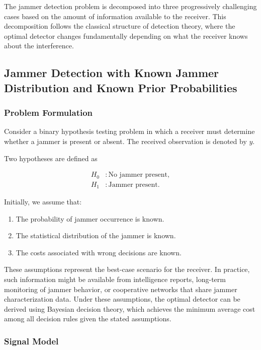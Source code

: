\documentclass{article}
\begin{document}
The jammer detection problem is decomposed into three progressively challenging cases based on the amount of information available to the receiver. This decomposition follows the classical structure of detection theory, where the optimal detector changes fundamentally depending on what the receiver knows about the interference.

\subsection{Jammer Detection with Known Jammer Distribution and Known Prior Probabilities}

\subsubsection{Problem Formulation}

Consider a binary hypothesis testing problem in which a receiver must determine whether a jammer is present or absent. The received observation is denoted by $y$.

Two hypotheses are defined as

\begin{align}
H_0 &: \text{No jammer present}, \\
H_1 &: \text{Jammer present}.
\end{align}

Initially, we assume that:

\begin{enumerate}
    \item The probability of jammer occurrence is known.
    \item The statistical distribution of the jammer is known.
    \item The costs associated with wrong decisions are known.
\end{enumerate}

These assumptions represent the best-case scenario for the receiver. In practice, such information might be available from intelligence reports, long-term monitoring of jammer behavior, or cooperative networks that share jammer characterization data. Under these assumptions, the optimal detector can be derived using Bayesian decision theory, which achieves the minimum average cost among all decision rules given the stated assumptions.

\subsubsection{Signal Model}
\end{document}
